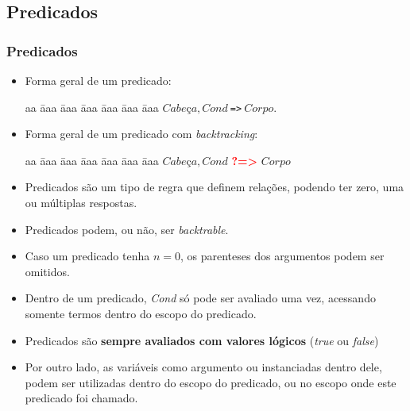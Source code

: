 
\subsection{Predicados}
\begin{frame}[c, fragile, allowframebreaks=0.75]
	\frametitle{Predicados}
    
    \begin{itemize}
        \item Forma geral de um predicado:
    
        \begin{tabbing}
          aa \= aaa \= aaa \= aaa \= aaa \= aaa \= aaa \kill
          \> \> $Cabeça, Cond\ $\verb+=>+$\ Corpo$. 
        \end{tabbing}
        
        \item  Forma geral de um predicado com \textit{backtracking}:
        
        \begin{tabbing}
          aa \= aaa \= aaa \= aaa \= aaa \= aaa \= aaa \kill
            \> \> $Cabeça, Cond$ \textbf{\textcolor{red}{?=>}} $Corpo$
        \end{tabbing}
    \end{itemize}
    
    \framebreak
    
    \begin{itemize}
    	\item Predicados são um tipo de regra que definem relações, podendo ter zero, uma ou múltiplas respostas.
    	
    	\item Predicados podem, ou não, ser \emph{backtrable}.
        
        \item Caso um predicado tenha $n = 0$, os parenteses dos argumentos podem ser omitidos.
        
        \framebreak
        
        \item Dentro de um predicado, \emph{Cond} só pode ser avaliado uma vez, acessando somente termos dentro do escopo do predicado.
        
        \item Predicados são \textbf{sempre avaliados com valores lógicos} ({\em true} ou {\em false})
        
        \item Por outro lado, as variáveis  como argumento ou  instanciadas
        dentro dele, podem ser utilizadas dentro do escopo do predicado, 
        ou no escopo onde
        este predicado foi chamado.
    \end{itemize}
    
\end{frame}

